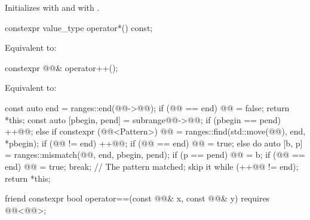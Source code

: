\begin{itemdescr}
\pnum
\effects
Initializes  with  and
 with .
\end{itemdescr}

%
\begin{itemdecl}
constexpr value_type operator*() const;
\end{itemdecl}

\begin{itemdescr}
\pnum
\effects
Equivalent to: 
\end{itemdescr}

%
\begin{itemdecl}
constexpr @@& operator++();
\end{itemdecl}

\begin{itemdescr}
\pnum
\effects
Equivalent to:
\begin{codeblock}
const auto end = ranges::end(@@->@@);
if (@@ == end) {
  @@ = false;
  return *this;
}
const auto [pbegin, pend] = subrange{@@->@@};
if (pbegin == pend) ++@@;
else if constexpr (@@<Pattern>) {
  @@ = ranges::find(std::move(@@), end, *pbegin);
  if (@@ != end) {
    ++@@;
    if (@@ == end)
      @@ = true;
  }
}
else {
  do {
    auto [b, p] = ranges::mismatch(@@, end, pbegin, pend);
    if (p == pend) {
      @@ = b;
      if (@@ == end)
        @@ = true;
      break;            // The pattern matched; skip it
    }
  } while (++@@ != end);
}
return *this;
\end{codeblock}
\end{itemdescr}

%
\begin{itemdecl}
friend constexpr bool operator==(const @@& x, const @@& y)
  requires @@<@@>;
\end{itemdecl}


